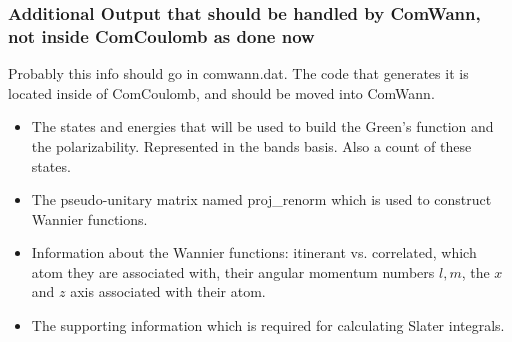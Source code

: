 \documentclass[aps,prb,singlecolumn,preprintnumbers,amsmath,amssymb]{revtex4}
\begin{document}
\subsubsection{ Additional Output that should be handled by ComWann, not inside ComCoulomb as done now}
Probably this info should go in comwann.dat. The code that generates it is located inside of ComCoulomb, and should be moved into ComWann.
\begin{itemize}
\item The states and energies that will be used to build the Green's function and the polarizability.  Represented in the bands basis.  Also a count of these states.
\item The pseudo-unitary matrix named proj\_renorm which is used to construct Wannier functions.  %
\item Information about the Wannier functions: itinerant vs. correlated, which atom they are associated with, their angular momentum numbers $l,m$, the $x$ and $z$ axis associated with their atom.
\item The supporting information which is required for calculating Slater integrals.
\end{itemize}
\end{document}
